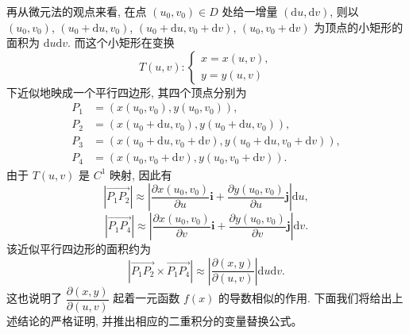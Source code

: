 \documentclass[UTF8,12pt,a4paper,fontset=fandol]{ctexart}
\begin{document}
再从微元法的观点来看, 在点 $(u_0,v_0)\in D$ 处给一增量 $(\mathrm du,\mathrm dv)$, 则以 $(u_0,v_0)$, $(u_0+\mathrm du,v_0)$, $(u_0+\mathrm du,v_0+\mathrm dv)$, $(u_0,v_0+\mathrm dv)$ 为顶点的小矩形的面积为 $\mathrm du\mathrm dv$. 而这个小矩形在变换
\[
  T(u,v):
  \begin{cases}
    x=x(u,v),\\
    y=y(u,v)
  \end{cases}
\]
下近似地映成一个平行四边形, 其四个顶点分别为
\[
\begin{aligned}
  P_1&=(x(u_0,v_0),y(u_0,v_0)),\\
  P_2&=(x(u_0+\mathrm du,v_0),y(u_0+\mathrm du,v_0)),\\
  P_3&=(x(u_0+\mathrm du,v_0+\mathrm dv),y(u_0+\mathrm du,v_0+\mathrm dv)),\\
  P_4&=(x(u_0,v_0+\mathrm dv),y(u_0,v_0+\mathrm dv)).
\end{aligned}
\]
由于 $T(u,v)$ 是 $C^1$ 映射, 因此有
\[
  |\overrightarrow{P_1P_2}|\approx
  \left|\frac{\partial x(u_0,v_0)}{\partial u}\boldsymbol i
  +\frac{\partial y(u_0,v_0)}{\partial u}\boldsymbol j\right|\mathrm du,
\]
\[
  |\overrightarrow{P_1P_4}|\approx
  \left|\frac{\partial x(u_0,v_0)}{\partial v}\boldsymbol i
  +\frac{\partial y(u_0,v_0)}{\partial v}\boldsymbol j\right|\mathrm dv.
\]
该近似平行四边形的面积约为
\[
  |\overrightarrow{P_1P_2}\times\overrightarrow{P_1P_4}|
  \approx
  \left|\frac{\partial(x,y)}{\partial(u,v)}\right|\mathrm du\mathrm dv.
\]
这也说明了 $\dfrac{\partial(x,y)}{\partial(u,v)}$ 起着一元函数 $f(x)$ 的导数相似的作用. 下面我们将给出上述结论的严格证明, 并推出相应的二重积分的变量替换公式。
\end{document}
